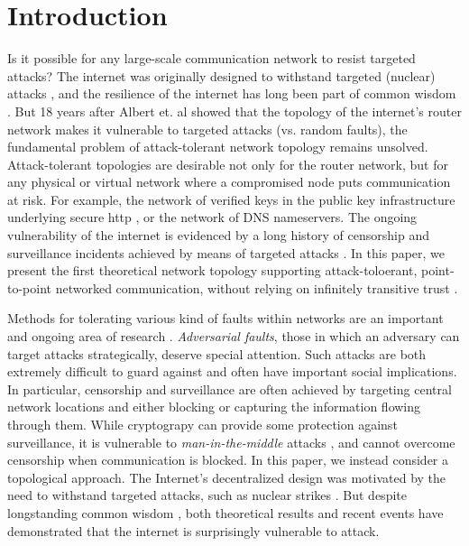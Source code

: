\documentclass[10pt,letterpaper]{article}
\begin{document}
\linenumbers

\section*{Introduction}

Is it possible for any large-scale communication network to resist targeted
attacks?
The internet was originally designed to withstand targeted (nuclear) attacks
\cite{baran_distributed_1964},
and the resilience of the internet has long been part of common wisdom
\cite{elmer-dewitt_first_1993}.
But 18 years after Albert et. al \cite{albert_error_2000}
showed that the topology of the internet's router network
makes it vulnerable to targeted attacks
(vs. random faults), the fundamental problem of attack-tolerant network topology
remains unsolved.
Attack-tolerant topologies are desirable not only for the router network,
but for any physical or virtual network where a compromised node puts
communication at risk.
For example, the network of verified keys in the public key infrastructure
underlying secure http \cite{ellison_ten_2000},
or the network of DNS nameservers.
The ongoing vulnerability of the internet is evidenced by a long history of 
censorship and surveillance incidents achieved by means of targeted attacks
\cite{dainotti_analysis_2011}.
In this paper, we present the first theoretical network topology
supporting attack-toloerant, point-to-point networked communication,
without relying on infinitely transitive trust
\cite{christianson_why_1997}.

Methods for tolerating various kind of faults within networks are an
important and ongoing area of research
\cite{zin_survey_2015,albert_error_2000,sterbenz_resilience_2010}.
{\em Adversarial faults},
those in which an adversary can target attacks strategically,
deserve special attention.
Such attacks are both extremely difficult to guard against and 
often have important social implications.
In particular, censorship and surveillance are often achieved
by targeting central network locations and either blocking or capturing
the information flowing through them.
While cryptograpy can provide some protection against surveillance, it is
vulnerable to {\em man-in-the-middle} attacks \cite{nayak_different_2010},
and cannot overcome censorship when communication is blocked.
In this paper, we instead consider a topological approach.
The Internet's decentralized design was motivated
by the need to withstand targeted attacks, such as nuclear strikes
\cite{baran_distributed_1964}.
But despite longstanding common wisdom \cite{elmer-dewitt_first_1993},
both theoretical results and recent events
have demonstrated that the internet is surprisingly vulnerable to attack.
\end{document}
